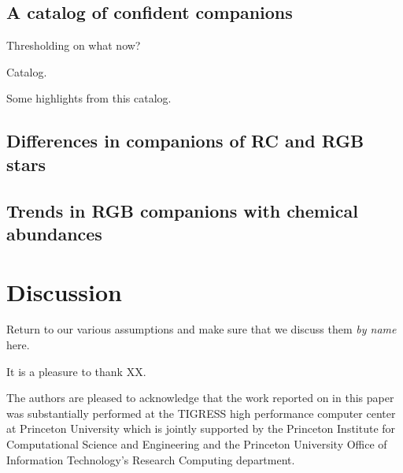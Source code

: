\documentclass[modern, letterpaper]{aastex61}
\newcommand{\apogee}{\project{\acronym{APOGEE}}}
\newcommand{\sdssiii}{\project{\acronym{SDSS-III}}}
\begin{document}

\subsection{A catalog of confident companions} \label{sec:conf-companions}


Thresholding on what now?

Catalog.

Some highlights from this catalog.

\subsection{Differences in companions of RC and RGB stars}
\label{sec:rc-rgb}


\subsection{Trends in RGB companions with chemical abundances}
\label{sec:rgb-chemistry}


\section{Discussion}

Return to our various assumptions and make sure that we discuss them
\emph{by name} here.

\acknowledgements

It is a pleasure to thank XX.

The authors are pleased to acknowledge that the work reported on in this
paper was substantially performed at the TIGRESS high performance computer
center at Princeton University which is jointly supported by the Princeton
Institute for Computational Science and Engineering and the Princeton
University Office of Information Technology's Research Computing department.


\facility{\sdssiii, \apogee}



\end{document}
